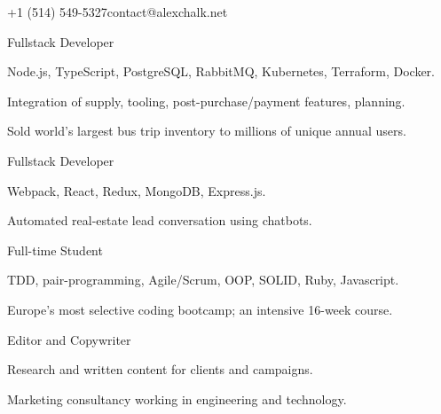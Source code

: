 \documentclass{edelgas-resume}
\begin{document}
\namehead%
\githubhead%
\address{7-6575 Rue Saint-Urbain, Montréal, QC, H2S 3G6, Canada}{+1 (514) 549-5327}{contact@alexchalk.net}


\vspace{-1.8em}
{\fontsize{10}{15}}
\vspace{1em}



\begin{position}{Fullstack Developer}{}
	\item Node.js, TypeScript, PostgreSQL, RabbitMQ, Kubernetes, Terraform, Docker.
  \item Integration of supply, tooling, post-purchase/payment features, planning.
  \item Sold world's largest bus trip inventory to millions of unique annual users.

\end{position}

\begin{position}{Fullstack Developer}{}
\item Webpack, React, Redux, MongoDB, Express.js.
\item Automated real-estate lead conversation using chatbots.

\end{position}


\begin{position}{Full-time Student}{}
\item TDD, pair-programming, Agile/Scrum, OOP, SOLID, Ruby, Javascript.
\item Europe's most selective coding bootcamp; an intensive 16-week course.

\end{position}

\begin{position}{Editor and Copywriter}{}
\item Research and written content for clients and campaigns.
\item Marketing consultancy working in engineering and technology.

\end{position}
\end{document}
